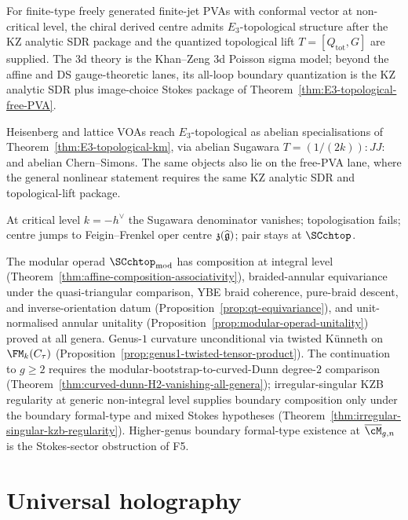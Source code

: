 \begin{maintheorem}
\label{thm:intro-e3-free-PVA}
For finite-type freely generated finite-jet PVAs with conformal vector
at non-critical level, the chiral derived centre admits
$E_3$-topological structure after the KZ analytic SDR package and the
quantized topological lift $T=[Q_{\mathrm{tot}},G]$ are supplied. The
3d theory is the Khan--Zeng 3d Poisson sigma model; beyond the affine
and DS gauge-theoretic lanes, its all-loop boundary quantization is the
KZ analytic SDR plus image-choice Stokes package of
Theorem~\ref{thm:E3-topological-free-PVA}.
\end{maintheorem}

Heisenberg and lattice VOAs reach $E_3$-topological as abelian
specialisations of Theorem~\ref{thm:E3-topological-km}, via abelian
Sugawara $T = (1/(2k))\!:JJ:$ and abelian Chern--Simons. The same
objects also lie on the free-PVA lane, where the general nonlinear
statement requires the same KZ analytic SDR and topological-lift
package.

At critical level $k = -h^\vee$ the Sugawara denominator
vanishes; topologisation fails; centre jumps to Feigin--Frenkel
oper centre $\mathfrak{z}(\widehat{\mathfrak{g}})$; pair stays at
$\SCchtop$.

The modular operad $\SCchtop_{\mathrm{mod}}$ has composition at
integral level
(Theorem~\ref{thm:affine-composition-associativity}),
braided-annular equivariance under the quasi-triangular comparison,
YBE braid coherence, pure-braid descent, and inverse-orientation datum
(Proposition~\ref{prop:qt-equivariance}), and
unit-normalised annular unitality
(Proposition~\ref{prop:modular-operad-unitality})
proved at all genera. Genus-$1$ curvature unconditional via
twisted K\"unneth on $\FM_k(C_\tau)$
(Proposition~\ref{prop:genus1-twisted-tensor-product}). The
continuation to $g \ge 2$ requires the
modular-bootstrap-to-curved-Dunn degree-\(2\) comparison
(Theorem~\ref{thm:curved-dunn-H2-vanishing-all-genera});
irregular-singular KZB regularity at generic non-integral level
supplies boundary composition only under the boundary formal-type
and mixed Stokes hypotheses
(Theorem~\ref{thm:irregular-singular-kzb-regularity}). Higher-genus
boundary formal-type existence at $\overline{\cM}_{g,n}$ is the
Stokes-sector obstruction of F5.


\section*{Universal holography}

